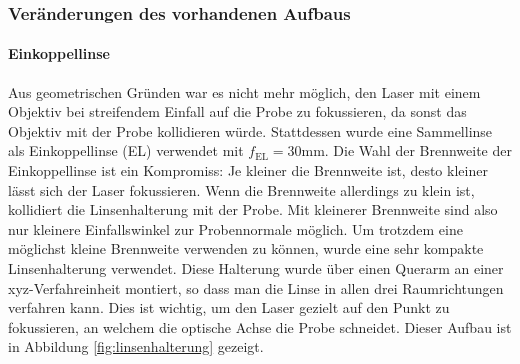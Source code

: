 \documentclass[titlepage,  ngerman]{article}
\begin{document}
	\subsubsection{Veränderungen des vorhandenen Aufbaus}
	\paragraph{Einkoppellinse}
	Aus geometrischen Gründen war es nicht mehr möglich, den Laser mit einem Objektiv bei streifendem Einfall auf die Probe zu fokussieren, da sonst das Objektiv mit der Probe kollidieren würde. Stattdessen wurde eine Sammellinse als Einkoppellinse (EL) verwendet mit $f_{\mathrm{EL}}= 30\mathrm{mm}$. Die Wahl der Brennweite der Einkoppellinse ist ein Kompromiss: Je kleiner die Brennweite ist, desto kleiner lässt sich der Laser fokussieren. Wenn die Brennweite allerdings zu klein ist, kollidiert die Linsenhalterung mit der Probe. Mit kleinerer Brennweite sind also nur kleinere Einfallswinkel zur Probennormale möglich. Um trotzdem eine möglichst kleine Brennweite verwenden zu können, wurde eine sehr kompakte Linsenhalterung verwendet. Diese Halterung wurde über einen Querarm an einer xyz-Verfahreinheit montiert, so dass man die Linse in allen drei Raumrichtungen verfahren kann. Dies ist wichtig, um den Laser gezielt auf den Punkt zu fokussieren, an welchem die optische Achse die Probe schneidet. Dieser Aufbau ist in Abbildung \ref{fig:linsenhalterung} gezeigt.
\end{document}
